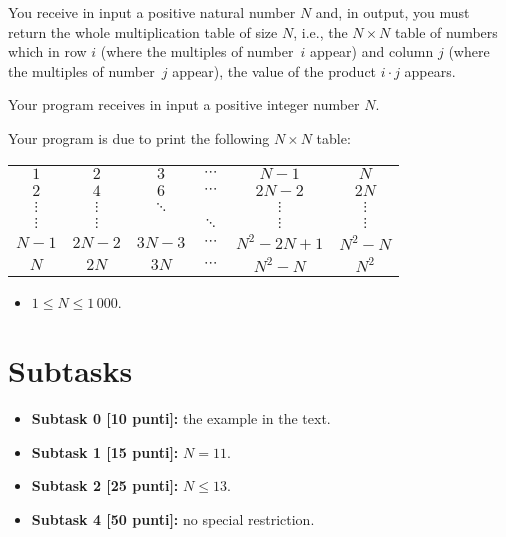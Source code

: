 \renewcommand{\nomebreve}{for2\_std}
\renewcommand{\titolo}{nested for - computing multiplication tables}

\introduzione{}

You receive in input a positive natural number $N$ and,
in output, you must return the whole multiplication table of size $N$,
i.e., the $N\times N$ table of numbers which
in row $i$ (where the multiples of number~$i$ appear)
and column $j$  (where the multiples of number~$j$ appear),
the value of the product $i\cdot j$ appears.

Your program receives in input a positive integer number $N$.


Your program is due to print the following $N\times N$ table:\\

\begin{tabular}{cccccc}
    $1$   &   $2$    &  $3$     & $\cdots$ &  $N-1$     &  $N$ \\
    $2$   &   $4$    &  $6$     & $\cdots$ & $2N-2$     & $2N$ \\
 $\vdots$ & $\vdots$ & $\ddots$ &          &   $\vdots$ &  $\vdots$ \\
 $\vdots$ & $\vdots$ &          & $\ddots$ &   $\vdots$ &  $\vdots$ \\
  $N-1$   & $2N-2$   & $3N-3$   & $\cdots$ & $N^2-2N+1$ & $N^2-N$ \\
    $N$   &  $2N$    & $3N$     & $\cdots$ &    $N^2-N$ &  $N^2$
\end{tabular}


\begin{itemize}[nolistsep, noitemsep]
  \item $1 \le N \le 1\,000$.
\end{itemize}
  
  \section*{Subtasks}
  \begin{itemize}
    \item \textbf{Subtask 0 [10 punti]:} the example in the text.
    \item \textbf{Subtask 1 [15 punti]:} $N = 11$.
    \item \textbf{Subtask 2 [25 punti]:} $N \leq 13$.
    \item \textbf{Subtask 4 [50 punti]:} no special restriction.
  \end{itemize}
  
